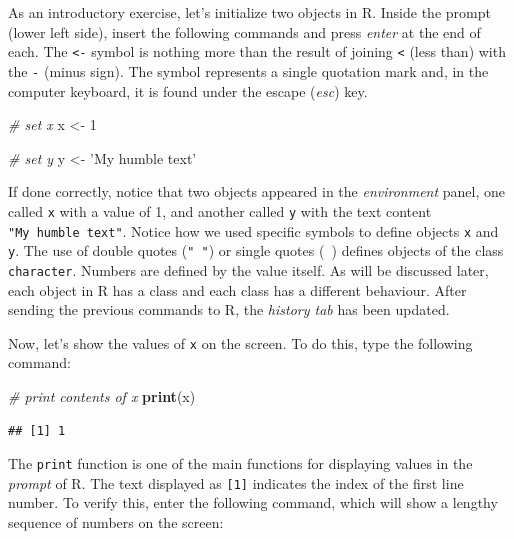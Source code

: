 \documentclass[11pt,]{book}
\newenvironment{Shaded}{\begin{snugshade}}{\end{snugshade}}
\newcommand{\KeywordTok}[1]{\textcolor[rgb]{0.27,0.27,0.27}{\textbf{#1}}}
\newcommand{\DecValTok}[1]{\textcolor[rgb]{0.06,0.06,0.06}{#1}}
\newcommand{\StringTok}[1]{\textcolor[rgb]{0.5,0.5,0.5}{#1}}
\newcommand{\CommentTok}[1]{\textcolor[rgb]{0.56,0.35,0.01}{\textit{#1}}}
\newcommand{\NormalTok}[1]{#1}
\begin{document}
As an introductory exercise, let's initialize two objects in R. Inside
the prompt (lower left side), insert the following commands and press
\emph{enter} at the end of each. The \texttt{\textless{}-} symbol is
nothing more than the result of joining \texttt{\textless{}} (less than)
with the \texttt{-} (minus sign). The \texttt{\textquotesingle{}} symbol
represents a single quotation mark and, in the computer keyboard, it is
found under the escape (\emph{esc}) key.

\begin{Shaded}
\begin{Highlighting}[]
\CommentTok{# set x}
\NormalTok{x <-}\StringTok{ }\DecValTok{1}

\CommentTok{# set y}
\NormalTok{y <-}\StringTok{ 'My humble text'}
\end{Highlighting}
\end{Shaded}

If done correctly, notice that two objects appeared in the
\emph{environment} panel, one called \texttt{x} with a value of 1, and
another called \texttt{y} with the text content
\texttt{"My\ humble\ text"}. Notice how we used specific symbols to
define objects \texttt{x} and \texttt{y}. The use of double quotes
(\texttt{"\ "}) or single quotes
(\texttt{\textquotesingle{}\ \textquotesingle{}}) defines objects of the
class \texttt{character}. Numbers are defined by the value itself. As
will be discussed later, each object in R has a class and each class has
a different behaviour. After sending the previous commands to R, the
\emph{history tab} has been updated.

Now, let's show the values of \texttt{x} on the screen. To do this, type
the following command:

\begin{Shaded}
\begin{Highlighting}[]
\CommentTok{# print contents of x}
\KeywordTok{print}\NormalTok{(x)}
\end{Highlighting}
\end{Shaded}

\begin{verbatim}
## [1] 1
\end{verbatim}

The \texttt{print} function is one of the main functions for displaying
values in the \emph{prompt} of R. The text displayed as \texttt{{[}1{]}}
indicates the index of the first line number. To verify this, enter the
following command, which will show a lengthy sequence of numbers on the
screen: 
\end{document}
